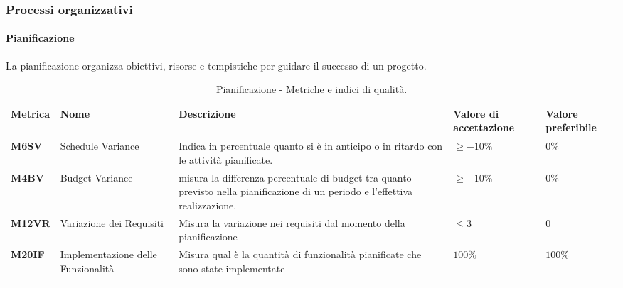 \subsubsection{Processi organizzativi}

\paragraph{Pianificazione}
La pianificazione organizza obiettivi, risorse e tempistiche per guidare il successo di un progetto.

\hspace{1pt}
    \begin{longtable}{|C{1.5cm}|L{3cm}|L{4cm}|L{2.5cm}|L{2.5cm}|}
        \hline
        \textbf{Metrica} & \textbf{Nome} & \textbf{Descrizione} & \textbf{Valore di accettazione} & \textbf{Valore preferibile} \\
        \hline
        \textbf{M6SV} & Schedule Variance & Indica in percentuale quanto si è in anticipo o in ritardo con le attività
        pianificate. & $\geq -10\%$ & $0\%$ \\
        \hline
        \textbf{M4BV} & Budget Variance & misura la differenza percentuale di budget tra quanto previsto nella 
        pianificazione di un periodo e l’effettiva realizzazione. & $\geq -10\%$ & $0\%$ \\
        \hline
        \textbf{M12VR} & Variazione dei Requisiti & Misura la variazione nei requisiti dal momento della pianificazione & $\leq 3$ & $0$ \\
        \hline
        \textbf{M20IF} & Implementazione delle Funzionalità & Misura qual è la quantità di funzionalità pianificate che sono state implementate & $ 100\%$ & $ 100\%$ \\
        \hline
    \caption{Pianificazione - Metriche e indici di qualità.}
    \label{tab:metriche_pianificazione}
\end{longtable}